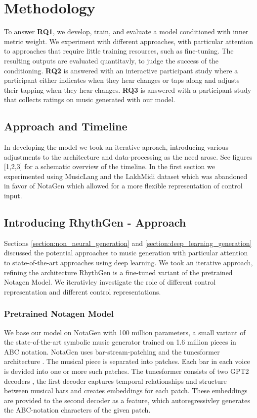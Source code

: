 \chapter{Methodology}
To answer \textbf{RQ1}, we develop, train, and evaluate a model conditioned with inner metric weight. We experiment with different approaches, with particular attention to approaches that require little training resources, such as fine-tuning. 
The resulting outputs are evaluated quantitavly, to judge the success of the conditioning.
\textbf{RQ2} is answered with an interactive participant study where a participant either indicates when they hear changes or taps along and adjusts their tapping when they hear changes. \textbf{RQ3} is answered with a participant study that collects ratings on music generated with our model. 

\section{Approach and Timeline}
In developing the model we took an iterative aproach, introducing various adjustments to the architecture and data-processing as the need arose. See figures [1,2,3] for a schematic overview of the timeline. 
In the first section we experimented using MusicLang and the LakhMidi dataset which was abandoned in favor of NotaGen which allowed for a more flexible representation of control input. 

\section{Introducing RhythGen - Approach}
Sections \ref{section:non_neural_generation} and \ref{section:deep_learning_generation} discussed the potential approaches to music generation with particular attention to state-of-the-art approaches using deep learning. 
We took an iterative approach, refining the architecture 
RhythGen is a fine-tuned variant of the pretrained Notagen Model. We iterativley investigate the role of different control representation and different control representations. 

\subsection{Pretrained Notagen Model}
We base our model on NotaGen with 100 million parameters\cite{wang2025notagenadvancingmusicalitysymbolic}, a small variant of the state-of-the-art symbolic music generator trained on 1.6 million pieces in ABC notation. NotaGen uses bar-stream-patching and the tunesformer architecture \cite{tunesformer}. The musical piece is separated into patches. Each bar in each voice is devided into one or more such patches. The tunesformer consists of two GPT2 decoders \cite{Radford_Wu_Child_Luan_gpt2_2019}, the first decoder captures temporal relationships and structure between musical bars and creates embeddings for each patch. These embeddings are provided to the second decoder as a feature, which autoregressivley generates the ABC-notation characters of the given patch. 

